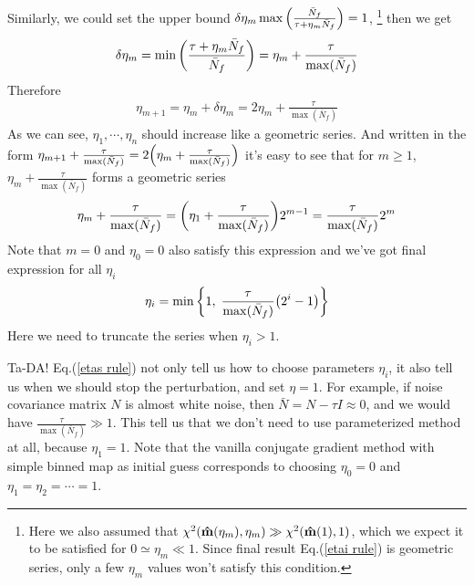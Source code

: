 \documentclass[11pt, letterpaper]{article}
\newcommand{\hatm}{\vb{\hat{m}}}
\newcommand{\Nbar}{\bar{N}}
\begin{document}
Similarly, we could set the upper bound
$\delta\eta_m \max \qty( \frac{\Nbar_f}{\tau + \eta_m \Nbar_f})=1$,
\footnote{Here we also assumed that
$\chi^2(\hatm(\eta_m),\eta_m) \gg \chi^2(\hatm(1),1)$,
which we expect it to be satisfied for $0 \simeq \eta_m \ll 1$. 
Since final result Eq.(\ref{etai rule}) is geometric series,
only a few $\eta_m$ values won't satisfy this condition.
}
then we get
\begin{align}
\delta \eta_m 
= \min \qty(\frac{\tau + \eta_m \Nbar_f}{\Nbar_f})
= \eta_m + \frac{\tau }{\max(\Nbar_f)}
\end{align}
Therefore 
\begin{align}
\eta_{m+1} = \eta_m + \delta\eta_m = 2\eta_m + \frac{\tau }{\max (\Nbar_f)}
\end{align}
As we can see, $\eta_1, \cdots, \eta_n$ should increase like a geometric
series. 
And written in the form $\eta_{m+1} + \frac{\tau }{\max(\Nbar_f)}
= 2 \qty( \eta_m + \frac{\tau}{\max(\Nbar_f)})$
it's easy to see that for $m \geq 1$,
$\eta_{m} + \frac{\tau }{\max(\Nbar_f)}$ forms a geometric series
\begin{align}
\eta_m +  \frac{\tau }{\max(\Nbar_f)}
=\qty(\eta_1 + \frac{\tau }{\max(\Nbar_f)}) 2^{m-1}
=\frac{\tau}{\max(\Nbar_f)} 2^m
\end{align}
Note that $m = 0$ and $\eta_0 = 0$ also satisfy this expression and we've got
final expression for all $\eta_i$
\begin{align}
\eta_i =\min \qty\bigg{1,\; \frac{\tau}{\max(\Nbar_f)} \qty(2^i -1) }
\label{etai rule}
\end{align}
Here we need to truncate the series when $\eta_i > 1$.

Ta-DA! Eq.(\ref{etas rule}) not only tell us how to choose parameters $\eta_i$,
it also tell us when we should stop the perturbation, and set $\eta = 1$.
For example, if noise covariance matrix $N$ is almost white noise,
then $\Nbar = N - \tau I \approx 0$,
and we would have $\frac{\tau}{\max(\Nbar_f)} \gg 1$.
This tell us that we don't need to use parameterized method at all, 
because $\eta_1 = 1$.
Note that the vanilla conjugate gradient method with simple binned map as
initial guess corresponds to choosing $\eta_0=0$ and $\eta_1= \eta_2 = \cdots
= 1$.
\end{document}
